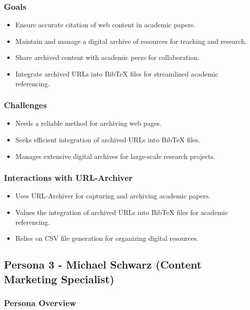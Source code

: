 \subsubsection{Goals}
\begin{itemize}
    \item Ensure accurate citation of web content in academic papers.
    \item Maintain and manage a digital archive of resources for teaching and research.
    \item Share archived content with academic peers for collaboration.
    \item Integrate archived URLs into BibTeX files for streamlined academic referencing.
\end{itemize}

\subsubsection{Challenges}
\begin{itemize}
    \item Needs a reliable method for archiving web pages.
    \item Seeks efficient integration of archived URLs into BibTeX files.
    \item Manages extensive digital archives for large-scale research projects.
\end{itemize}

\subsubsection{Interactions with URL-Archiver}
\begin{itemize}
    \item Uses URL-Archiver for capturing and archiving academic papers.
    \item Values the integration of archived URLs into BibTeX files for academic referencing.
    \item Relies on CSV file generation for organizing digital resources.
\end{itemize}

\clearpage
\subsection{Persona 3 - Michael Schwarz (Content Marketing Specialist)}

\subsubsection{Persona Overview}

